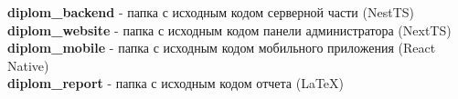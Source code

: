 

\newpage
{}
\tableofcontents
\noindent \textbf{diplom\_backend} - папка с исходным кодом серверной части (NestTS) \\
\textbf{diplom\_website} - папка с исходным кодом панели администратора (NextTS) \\
\textbf{diplom\_mobile} - папка с исходным кодом мобильного приложения (React Native) \\
\textbf{diplom\_report} - папка с исходным кодом отчета (LaTeX) \\

\newpage
{}
\thispagestyle{plain}
\pagestyle{plain}
